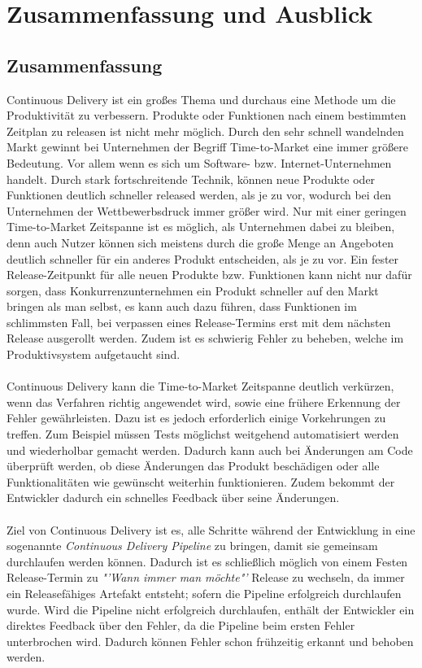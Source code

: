 \chapter{Zusammenfassung und Ausblick}
\label{chap:zusammenfassungUndAusblick}

\section{Zusammenfassung}
\label{sec:zusammenfassung}
Continuous Delivery ist ein großes Thema und durchaus eine Methode um die Produktivität zu verbessern. Produkte oder Funktionen nach einem bestimmten Zeitplan zu releasen ist nicht mehr möglich. Durch den sehr schnell wandelnden Markt gewinnt bei Unternehmen der Begriff Time-to-Market eine immer größere Bedeutung. Vor allem wenn es sich um Software- bzw. Internet-Unternehmen handelt. Durch stark fortschreitende Technik, können neue Produkte oder Funktionen deutlich schneller released werden, als je zu vor, wodurch bei den Unternehmen der Wettbewerbsdruck immer größer wird. Nur mit einer geringen Time-to-Market Zeitspanne ist es möglich, als Unternehmen dabei zu bleiben, denn auch Nutzer können sich meistens durch die große Menge an Angeboten deutlich schneller für ein anderes Produkt entscheiden, als je zu vor. Ein fester Release-Zeitpunkt für alle neuen Produkte bzw. Funktionen kann nicht nur dafür sorgen, dass Konkurrenzunternehmen ein Produkt schneller auf den Markt bringen als man selbst, es kann auch dazu führen, dass Funktionen im schlimmsten Fall, bei verpassen eines Release-Termins erst mit dem nächsten Release ausgerollt werden. Zudem ist es schwierig Fehler zu beheben, welche im Produktivsystem aufgetaucht sind.
\\\\
Continuous Delivery kann die Time-to-Market Zeitspanne deutlich verkürzen, wenn das Verfahren richtig angewendet wird, sowie eine frühere Erkennung der Fehler gewährleisten. Dazu ist es jedoch erforderlich einige Vorkehrungen zu treffen. Zum Beispiel müssen Tests möglichst weitgehend automatisiert werden und wiederholbar gemacht werden. Dadurch kann auch bei Änderungen am Code überprüft werden, ob diese Änderungen das Produkt beschädigen oder alle Funktionalitäten wie gewünscht weiterhin funktionieren. Zudem bekommt der Entwickler dadurch ein schnelles Feedback über seine Änderungen.
\\\\
Ziel von Continuous Delivery ist es, alle Schritte während der Entwicklung in eine sogenannte \textit{Continuous Delivery Pipeline} zu bringen, damit sie gemeinsam durchlaufen werden können. Dadurch ist es schließlich möglich von einem Festen Release-Termin zu \textit{"'Wann immer man möchte"'} Release zu wechseln, da immer ein Releasefähiges Artefakt entsteht; sofern die Pipeline erfolgreich durchlaufen wurde. Wird die Pipeline nicht erfolgreich durchlaufen, enthält der Entwickler ein direktes Feedback über den Fehler, da die Pipeline beim ersten Fehler unterbrochen wird. Dadurch können Fehler schon frühzeitig erkannt und behoben werden.

